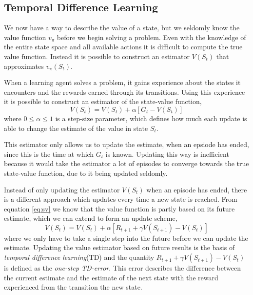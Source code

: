 \documentclass[11pt]{article}
\begin{document}
\maketitle

\subsection{Temporal Difference Learning}\label{sec:td}

We now have a way to describe the value of a state, but we seldomly know the
value function $v_\pi$ before we begin solving a problem.
Even with the knowledge of the entire state space and all available actions
it is difficult to compute the true value function.
Instead it is possible to construct an estimator $V(S_t)$ that
approximates $v_\pi(S_t)$.

When a learning agent solves a problem, it gains experience
about the states it encounters and the rewards earned through its transitions.
Using this experience it is possible to construct an estimator 
of the state-value function,
\begin{equation}
    V(S_t) = V(S_t) + \alpha [G_t - V(S_t)]
\end{equation}
where $0 \leq \alpha \leq 1$ is a step-size parameter, 
which defines how much each update is able to change the estimate
of the value in state $S_t$.

This estimator only allows us to update the estimate, when an epsiode
has ended, since this is the time at which $G_t$ is known.
Updating this way is inefficient because it would take the estimator
a lot of episodes to converge towards the true state-value function,
due to it being updated seldomly. 

Instead of only updating the estimator $V(S_t)$ when an episode has
ended, there is a different approach which updates
every time a new state is reached.
From equation \ref{eq:sv} we know that the value function is partly based on its future
estimate, which we can extend to form an update scheme,
\begin{equation}\label{eq:up}
    V(S_t) = V(S_t) + \alpha  [R_{t+1} + \gamma  V(S_{t+1}) - V(S_t)]
\end{equation}
where we only have to take a single step into the future before we can 
update the estimate.
Updating the value estimator based on future results is the basis
of \textit{temporal difference learning}(TD) and the quantity $R_{t+1} + \gamma  V(S_{t+1}) - V(S_t)$
is defined as the \textit{one-step TD-error}.
This error describes the difference between the current estimate
and the estimate of the next state with the reward experienced from the
transition the new state.
\end{document}
